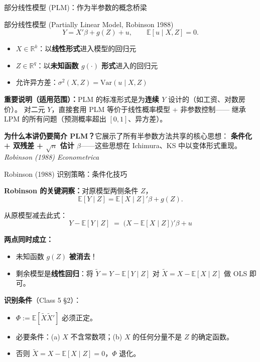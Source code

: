 \documentclass[aspectratio=169, 10pt]{beamer}
\begin{document}
\begin{frame}{部分线性模型 (PLM)：作为半参数的概念桥梁}

  \begin{definitionbox}{{部分线性模型 (Partially Linear Model, Robinson 1988)}}
    $$Y = X'\beta + g(Z) + u, \qquad \mathbb{E}[u\mid X, Z] = 0.$$
    \begin{itemize}\setlength{\itemsep}{1pt}
      \item $X \in \mathbb{R}^k$：以\textbf{线性形式}进入模型的回归元
      \item $Z \in \mathbb{R}^q$：以\textbf{未知函数 $g(\cdot)$ 形式}进入的回归元
      \item 允许异方差：$\sigma^2(X, Z) = \mathrm{Var}(u\mid X, Z)$
    \end{itemize}
  \end{definitionbox}

  \begin{keybox}
    \textbf{重要说明（适用范围）：}PLM 的标准形式是为\textbf{连续 $Y$} 设计的（如工资、对数房价）。
    对二元 $Y$，直接套用 PLM 等价于线性概率模型 + 非参数控制——
    继承 LPM 的所有问题（预测概率超出 $[0,1]$、异方差）。
  \end{keybox}

  \textbf{为什么本讲仍要简介 PLM？}它展示了所有半参数方法共享的核心思想：
  \textbf{条件化 + 双残差 + $\sqrt{n}$ 估计 $\beta$}——这些思想在 Ichimura、KS 中以变体形式重现。
  \hfill{\scriptsize\textit{Robinson (1988) Econometrica}}

\end{frame}

\begin{frame}{Robinson (1988) 识别策略：条件化技巧}

  \textbf{Robinson 的关键洞察：}对原模型两侧条件 $Z$，
  $$\mathbb{E}[Y\mid Z] = \mathbb{E}[X\mid Z]'\beta + g(Z).$$

  从原模型减去此式：
  $$\boxed{\;Y - \mathbb{E}[Y\mid Z] \;=\; \bigl(X - \mathbb{E}[X\mid Z]\bigr)'\beta + u\;}$$

  \begin{highlightbox}
    \textbf{两点同时成立：}
    \begin{itemize}\setlength{\itemsep}{1pt}
      \item 未知函数 $g(Z)$ \textbf{被消去}！
      \item 剩余模型是\textbf{线性回归}：将 $\tilde Y = Y - \mathbb{E}[Y\mid Z]$ 对
      $\tilde X = X - \mathbb{E}[X\mid Z]$ 做 OLS 即可。
    \end{itemize}
  \end{highlightbox}

  \textbf{识别条件}（Class 5 §2）：
  \begin{itemize}\setlength{\itemsep}{1pt}
    \item $\Phi := \mathbb{E}[\tilde X \tilde X']$ 必须正定。
    \item 必要条件：(a) $X$ 不含常数项；(b) $X$ 的任何分量不是 $Z$ 的确定函数。
    \item 否则 $\tilde X = X - \mathbb{E}[X\mid Z] = 0$，$\Phi$ 退化。
  \end{itemize}

\end{frame}
\end{document}

